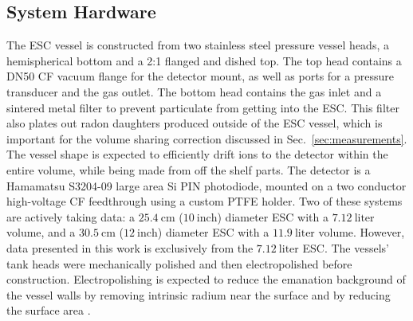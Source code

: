 \documentclass[final,3p,times]{elsarticle}
\begin{document}
\subsection{System Hardware}
The ESC vessel is constructed from two stainless steel pressure vessel heads, a hemispherical bottom and a 2:1 flanged and dished top.
The top head contains a DN50 CF vacuum flange for the detector mount, as well as ports for a pressure transducer and the gas outlet.
The bottom head contains the gas inlet and a sintered metal filter to prevent particulate from getting into the ESC.
This filter also plates out radon daughters produced outside of the ESC vessel, which is important for the volume sharing correction discussed in Sec.~\ref{sec:measurements}.
The vessel shape is expected to efficiently drift ions to the detector within the entire volume, while being made from off the shelf parts.
The detector is a Hamamatsu S3204-09 large area Si PIN photodiode, mounted on a two conductor high-voltage CF feedthrough using a custom PTFE holder.  
Two of these systems are actively taking data: a $25.4~\text{cm}$ ($10~\text{inch}$) diameter ESC with a $7.12~\text{liter}$ volume, and a $30.5~\text{cm}$ ($12~\text{inch}$) diameter ESC with a $11.9~\text{liter}$ volume. 
However, data presented in this work is exclusively from the $7.12~\text{liter}$ ESC.
The vessels' tank heads were mechanically polished and then electropolished before construction.
Electropolishing is expected to reduce the emanation background of the vessel walls by removing intrinsic radium near the surface and by reducing the surface area \cite{electropolishing_reduce_Rn}. 
\end{document}
